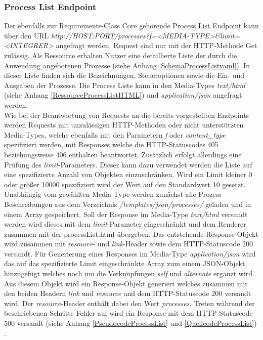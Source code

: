 \subsubsection{Process List Endpoint}
Der ebenfalls zur Requirements-Class Core gehörende Process List Endpoint kann über den URL \textit{http://HOST:PORT/processes?f=<MEDIA-TYPE>\&limit=<INTEGRER>} 
angefragt werden. Request sind nur mit der HTTP-Methode Get zulässig. Als Ressource erhalten Nutzer eine detaillierte Liste der durch die Anwendung angebotenen 
Prozesse (siehe Anhang \ref{SchemaProcessListyaml}). In dieser Liste finden sich die Bezeichnungen, 
Steueroptionen sowie die Ein- und Ausgaben der Prozesse. Die Process Liste kann in den Media-Types \textit{text/html} (siehe Anhang \ref{RessourceProcessListHTML}) 
und \textit{application/json} angefragt werden. \\

Wie bei der Beantwortung von Requests an die bereits vorgestellten Endpoints werden Requests mit unzulässigen HTTP-Methoden oder nicht unterstützten Media-Types,
welche ebenfalls mit den Parametern \textit{f} oder \textit{content\_type} spezifiziert werden, 
mit Responses welche die HTTP-Statuscodes 405 beziehungsweise 406 enthalten beantwortet.  
Zusätzlich erfolgt allerdings eine Prüfung des \textit{limit}-Parameters. Dieser kann dazu verwendet werden die Liste auf eine spezifizierte Anzahl von 
Objekten einzuschränken. Wird ein Limit kleiner 0 oder größer 10000 spezifiziert wird der Wert auf den Standardwert 10 gesetzt. 
Unabhängig vom gewählten Media-Type werden zunächst alle Prozess Beschreibungen aus dem Verzeichnis \textit{/templates/json/processes/} geladen und in einem 
Array gespeichert. Soll der Response im Media-Type \textit{text/html} versandt werden wird dieses mit dem \textit{limit}-Parameter eingeschränkt und dem Renderer 
zusammen mit der processList.html übergeben. Das entstehende Response-Objekt wird zusammen mit \textit{resource}- und \textit{link}-Header sowie dem 
HTTP-Statuscode 200 versandt. Für Generierung eines Responses im Media-Type \textit{application/json} wird das auf das spezifizierte Limit eingeschränkte 
Array zum einem JSON-Objekt hinzugefügt welches noch um die Verknüpfungen \textit{self} und \textit{alternate} ergänzt wird. Aus diesem Objekt wird ein 
Response-Objekt generiert welches zusammen mit den beiden Headern \textit{link} und \textit{resource} und dem HTTP-Statuscode 200 versandt wird. 
Der \textit{resource}-Header enthält dabei den Wert \textit{processes}. 
Treten während der beschriebenen Schritte Fehler auf wird ein Response mit dem HTTP-Statuscode 500 versandt (siehe Anhang \ref{PseudocodeProcessList} und
 \ref{QuellcodeProcessList}) \cite{ogc_api_processes_core}.

